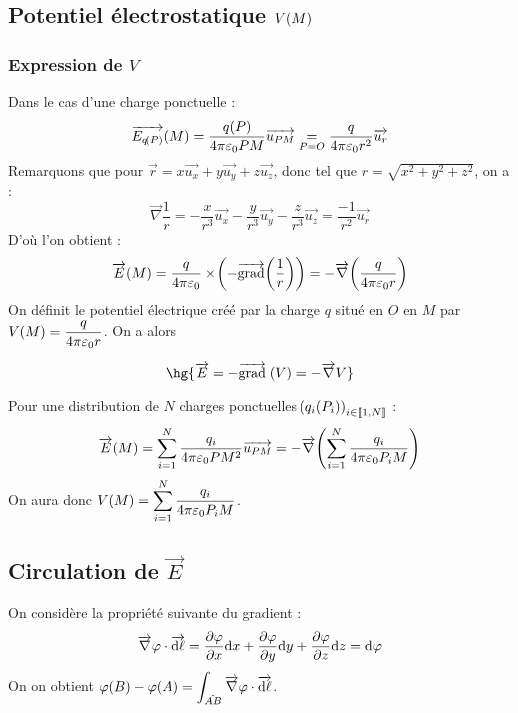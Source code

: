 \documentclass[a4paper,french,bookmarks]{book}
\begin{document}
    \subsection{Potentiel électrostatique $V\!\left(M\right)$}
    
    \subsubsection{Expression de $V$}
    \begin{enumerate}
        \itt Dans le cas d'une charge ponctuelle :
        \[ \vec{E_{q\p{P}}}\p{M} = \dfrac{q\p{P}}{4\pi \epsilon_0 PM}\vec{u_{PM}} \eq{P = O} \dfrac{q}{4\pi \epsilon_0 r^2}\vec{u_r} \]
        Remarquons que pour $\vec r = x\vec{u_x} + y\vec{u_y} + z\vec{u_z}$, donc tel que $r = \sqrt{x^2 + y^2 + z^2}$, on a :
        \[ \vec \nabla \dfrac{1}{r} = -\dfrac{x}{r^3}\vec{u_x} - \dfrac{y}{r^3}\vec{u_y} - \dfrac{z}{r^3}\vec{u_z} = \dfrac{-1}{r^2}\vec{u_r}\]
        D'où l'on obtient :
        \[ \overrightarrow{E}\!\left(M\right) = \dfrac{q}{4\pi \varepsilon_0}\times \!\left(-\overrightarrow{\operatorname{grad}}\!\left(\dfrac{1}{r}\right)\right) = -\overrightarrow{\nabla}\!\left(\dfrac{q}{4\pi\varepsilon_0 r}\right) \]
        On définit le potentiel électrique créé par la charge $q$ situé en $O$ en $M$ par $V\!\left(M\right) = \dfrac{q}{4\pi\varepsilon_0 r}$. On a alors 
        \begin{property}{}{}
            \[ \hg{\vec E = -\vec{\grad}\;\p{V} = - \vec\nabla V}\]
        \end{property}
        
        \itt Pour une distribution de $N$ charges ponctuelles $\!\left(q_i\!\left(P_i\right)\right)_{i \in \left\llbracket1, N\right\rrbracket}$ :
        \[ \overrightarrow{E}\!\left(M\right) = \sum_{i= 1}^N \dfrac{q_i}{4\pi \varepsilon_0 PM^2}\overrightarrow{u_{PM}} = - \overrightarrow{\nabla}\!\left(\sum_{i=1}^N \dfrac{q_i}{4\pi \varepsilon_0 P_iM}\right)\]
        On aura donc $V\!\left(M\right) = \displaystyle\sum_{i=1}^N \dfrac{q_i}{4\pi \varepsilon_0 P_iM}$.
    \end{enumerate}

    \subsection{Circulation de $\vec E$}

    On considère la propriété suivante du gradient :
    \[ \overrightarrow{\nabla} \varphi \cdot \overrightarrow{\mathrm d \ell} = \dfrac{\partial \varphi}{\partial x} \mathrm d x + \dfrac{\partial \varphi}{\partial y}\mathrm d y + \dfrac{\partial \varphi}{\partial z}\mathrm d z = \mathrm d \varphi\]
    On on obtient $\varphi\!\left(B\right) - \varphi\!\left(A\right) = \displaystyle\int_{\hat{AB}} \overrightarrow{\nabla} \varphi \cdot \overrightarrow{\mathrm d \ell}$.
    
\end{document}
